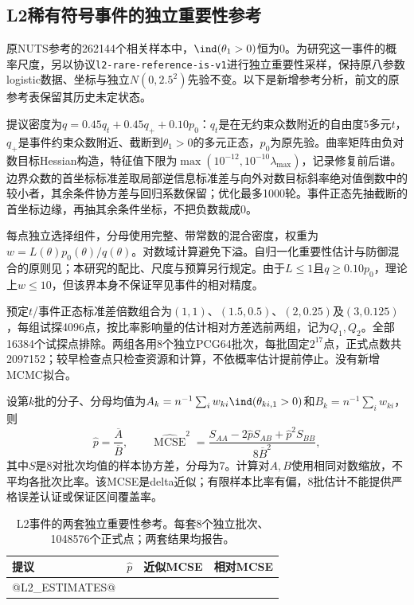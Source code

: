 \subsection{L2稀有符号事件的独立重要性参考}
原NUTS参考的262144个相关样本中，$\ind(\theta_1>0)$恒为0。为研究这一事件的概率尺度，另以协议\texttt{l2-rare-reference-is-v1}进行独立重要性采样，保持原八参数logistic数据、坐标与独立$N(0,2.5^2)$先验不变。以下是新增参考分析，前文的原参考表保留其历史未定状态。

提议密度为$q=0.45q_t+0.45q_++0.10p_0$：$q_t$是在无约束众数附近的自由度5多元$t$，$q_+$是事件约束众数附近、截断到$\theta_1>0$的多元正态，$p_0$为原先验。曲率矩阵由负对数目标Hessian构造，特征值下限为$\max(10^{-12},10^{-10}\lambda_{\max})$，记录修复前后谱。边界众数的首坐标标准差取局部逆信息标准差与向外对数目标斜率绝对值倒数中的较小者，其余条件协方差与回归系数保留；优化最多1000轮。事件正态先抽截断的首坐标边缘，再抽其余条件坐标，不把负数裁成0。

每点独立选择组件，分母使用完整、带常数的混合密度，权重为$w=L(\theta)p_0(\theta)/q(\theta)$。对数域计算避免下溢。自归一化重要性估计与防御混合的原则见\cite{owen}；本研究的配比、尺度与预算另行规定。由于$L\leq1$且$q\geq0.10p_0$，理论上$w\leq10$，但该界本身不保证罕见事件的相对精度。

预定$t$/事件正态标准差倍数组合为$(1,1)$、$(1.5,0.5)$、$(2,0.25)$及$(3,0.125)$，每组试探4096点，按比率影响量的估计相对方差选前两组，记为$Q_1,Q_2$。全部16384个试探点排除。两组各用8个独立PCG64批次，每批固定$2^{17}$点，正式点数共2097152；较早检查点只检查资源和计算，不依概率估计提前停止。没有新增MCMC拟合。

设第$k$批的分子、分母均值为$A_k=n^{-1}\sum_iw_{ki}\ind(\theta_{ki,1}>0)$和$B_k=n^{-1}\sum_iw_{ki}$，则
\[
\widehat p=\frac{\overline A}{\overline B},\qquad
\widehat{\operatorname{MCSE}}^2=
\frac{S_{AA}-2\widehat pS_{AB}+\widehat p^2S_{BB}}
{8\overline B^2},
\]
其中$S$是8对批次均值的样本协方差，分母为7。计算对$A,B$使用相同对数缩放，不平均各批次比率。该MCSE是delta近似；有限样本比率有偏，8批估计不能提供严格误差认证或保证区间覆盖率。

\begin{table}[htbp]\centering\small
\begin{tabular}{lrrr}\toprule
提议 & $\widehat p$ & 近似MCSE & 相对MCSE\\\midrule
@L2_ESTIMATES@
\bottomrule\end{tabular}
\caption{L2事件的两套独立重要性参考。每套8个独立批次、1048576个正式点；两套结果均报告。}
\label{tab:l2-importance-estimates}
\end{table}

